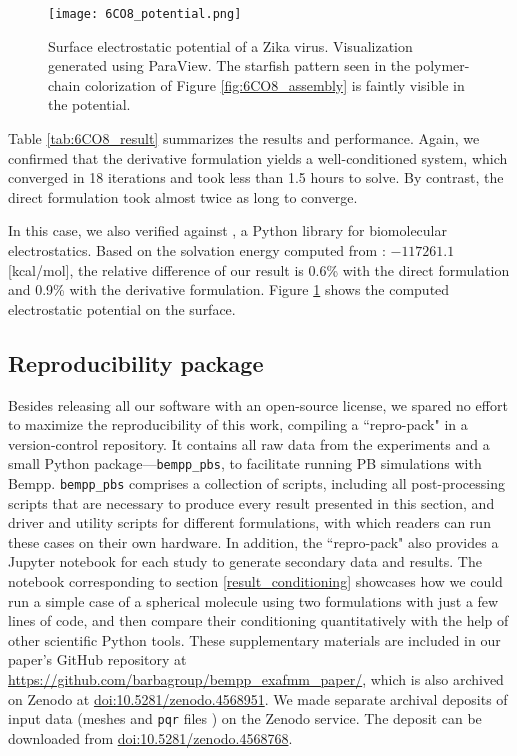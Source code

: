 \begin{figure*}[t]%
    \centering
    \texttt{[image: 6CO8\_potential.png]} 
    \caption{Surface electrostatic potential of a Zika virus. Visualization generated using ParaView. The starfish pattern seen in the polymer-chain colorization of Figure \ref{fig:6CO8_assembly} is faintly visible in the potential.}
    \label{fig:6CO8_potential}
\end{figure*}

Table \ref{tab:6CO8_result} summarizes the results and performance.
Again, we confirmed that the derivative formulation yields a well-conditioned system, which converged in 18 iterations and took less than 1.5 hours to solve.
By contrast, the direct formulation took almost twice as long to converge.

In this case, we also verified against \pygbe \cite{cooper2016pygbe}, a Python \bem library for biomolecular electrostatics.
Based on the solvation energy computed from \pygbe: $-117261.1$ [kcal/mol], the relative difference of our result is 0.6\% with the direct formulation and 0.9\% with the derivative formulation.
Figure \ref{fig:6CO8_potential} shows the computed electrostatic potential on the surface.

\subsection{Reproducibility package}

Besides releasing all our software with an open-source license, we spared no effort to maximize the reproducibility of this work, compiling a ``repro-pack" in a version-control repository.
It contains all raw data from the experiments and a small Python package---\texttt{bempp\_pbs}, to facilitate running PB simulations with Bempp.
\texttt{bempp\_pbs} comprises a collection of scripts, including all post-processing scripts that are necessary to produce every result presented in this section, and driver and utility scripts for different formulations, with which readers can run these cases on their own hardware.
In addition, the ``repro-pack" also provides a Jupyter notebook for each study to generate secondary data and results.
The notebook corresponding to section \ref{result_conditioning} showcases how we could run a simple case of a spherical molecule using two formulations with just a few lines of code, and then compare their conditioning quantitatively with the help of other scientific Python tools.
These supplementary materials are included in our paper's GitHub repository at \href{https://github.com/barbagroup/bempp\_exafmm\_paper/}{https://github.com/barbagroup/bempp\_exafmm\_paper/}, which is also archived on Zenodo at \href{http://doi.org/10.5281/zenodo.4568951}{doi:10.5281/zenodo.4568951}.
We made separate archival deposits of input data (meshes and \texttt{pqr} files ) on the Zenodo service.
The deposit can be downloaded from \href{http://doi.org/10.5281/zenodo.4568768}{doi:10.5281/zenodo.4568768}.
